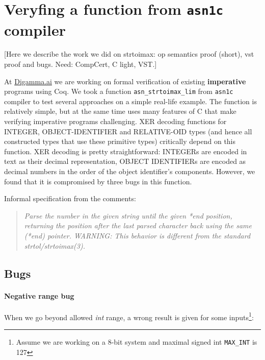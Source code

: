 \documentclass[acmsmall,nonacm]{acmart}
\begin{document}
\section{Veryfing a function from \texttt{asn1c} compiler}

[Here we describe the work we did on strtoimax: op semantics proof (short), vst proof and bugs. Need: CompCert, C light, VST.]

  At \url{Digamma.ai} we are working on formal verification of existing {\bf imperative} programs using Coq. We took a function \texttt{asn\_strtoimax\_lim} from \texttt{asn1c} compiler to test several approaches on a simple real-life example. The function is relatively simple, but at the same time uses many features of C that make verifying imperative programs challenging. XER decoding functions for INTEGER, OBJECT-IDENTIFIER and RELATIVE-OID types (and hence all constructed types that use these primitive types) critically depend on this function. XER decoding is pretty straightforward: INTEGERs are encoded in text as their decimal representation, OBJECT IDENTIFIERs are encoded as decimal numbers in the order of the object identifier's components. However, we found that it is compromised by three bugs in this function.
  
    Informal specification from the comments: 
  \begin{quote}

 { \it Parse the number in the given string until the given *end position,
 returning the position after the last parsed character back using the
 same (*end) pointer.
 WARNING: This behavior is different from the standard strtol/strtoimax(3). }
\end{quote}



\subsection{Bugs}

  
  
\paragraph{Negative range bug}

When we go beyond allowed \textit{int} range, a wrong result is given for some inputs\footnote{Assume we are working on a 8-bit system and maximal signed int \texttt{MAX\_INT} is 127}:
\end{document}
